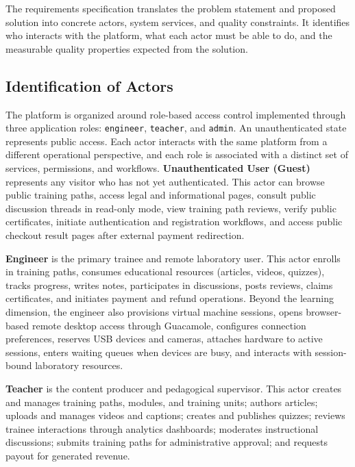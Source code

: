 The requirements specification translates the problem statement and proposed solution
into concrete actors, system services, and quality constraints. It identifies who
interacts with the platform, what each actor must be able to do, and the measurable
quality properties expected from the solution.

\subsection{Identification of Actors}

The platform is organized around role-based access control implemented through three
application roles: \texttt{engineer}, \texttt{teacher}, and \texttt{admin}. An
unauthenticated state represents public access. Each actor interacts with the same
platform from a different operational perspective, and each role is associated with a
distinct set of services, permissions, and workflows. 
\textbf{Unauthenticated User (Guest)} represents any visitor who has not yet
authenticated. This actor can browse public training paths, access legal and
informational pages, consult public discussion threads in read-only mode, view
training path reviews, verify public certificates, initiate authentication and
registration workflows, and access public checkout result pages after external payment
redirection.

\textbf{Engineer} is the primary trainee and remote laboratory user. This actor
enrolls in training paths, consumes educational resources (articles, videos, quizzes),
tracks progress, writes notes, participates in discussions, posts reviews, claims
certificates, and initiates payment and refund operations. Beyond the learning
dimension, the engineer also provisions virtual machine sessions, opens browser-based
remote desktop access through Guacamole, configures connection preferences, reserves
USB devices and cameras, attaches hardware to active sessions, enters waiting queues
when devices are busy, and interacts with session-bound laboratory resources.

\textbf{Teacher} is the content producer and pedagogical supervisor. This actor
creates and manages training paths, modules, and training units; authors articles;
uploads and manages videos and captions; creates and publishes quizzes; reviews
trainee interactions through analytics dashboards; moderates instructional discussions;
submits training paths for administrative approval; and requests payout for generated
revenue.

